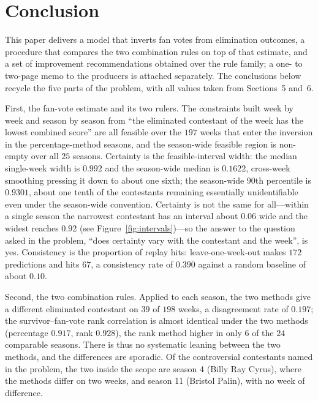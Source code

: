 \section{Conclusion}
\label{sec:conclusion}


This paper delivers a model that inverts fan votes from elimination outcomes, a procedure that compares the two combination rules on top of that estimate, and a set of improvement recommendations obtained over the rule family; a one- to two-page memo to the producers is attached separately. The conclusions below recycle the five parts of the problem, with all values taken from Sections~5 and~6.

First, the fan-vote estimate and its two rulers. The constraints built week by week and season by season from ``the eliminated contestant of the week has the lowest combined score'' are all feasible over the $197$ weeks that enter the inversion in the percentage-method seasons, and the season-wide feasible region is non-empty over all $25$ seasons. Certainty is the feasible-interval width: the median single-week width is $0.992$ and the season-wide median is $0.1622$, cross-week smoothing pressing it down to about one sixth; the season-wide 90th percentile is $0.9301$, about one tenth of the contestants remaining essentially unidentifiable even under the season-wide convention. Certainty is not the same for all---within a single season the narrowest contestant has an interval about $0.06$ wide and the widest reaches $0.92$ (see Figure~\ref{fig:intervals})---so the answer to the question asked in the problem, ``does certainty vary with the contestant and the week'', is yes. Consistency is the proportion of replay hits: leave-one-week-out makes $172$ predictions and hits $67$, a consistency rate of $0.390$ against a random baseline of about $0.10$.

Second, the two combination rules. Applied to each season, the two methods give a different eliminated contestant on $39$ of $198$ weeks, a disagreement rate of $0.197$; the survivor--fan-vote rank correlation is almost identical under the two methods (percentage $0.917$, rank $0.928$), the rank method higher in only $6$ of the $24$ comparable seasons. There is thus no systematic leaning between the two methods, and the differences are sporadic. Of the controversial contestants named in the problem, the two inside the scope are season 4 (Billy Ray Cyrus), where the methods differ on two weeks, and season 11 (Bristol Palin), with no week of difference.

